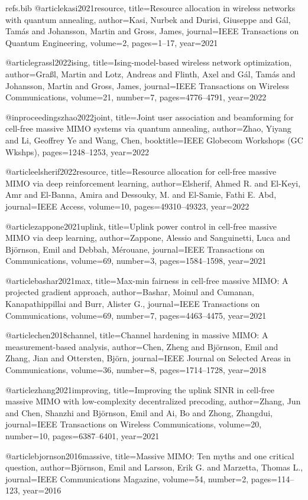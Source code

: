 \begin{filecontents*}{refs.bib}
@article{kasi2021resource,
  title={Resource allocation in wireless networks with quantum annealing},
  author={Kasi, Nurbek and Durisi, Giuseppe and G{\'a}l, Tam{\'a}s and Johansson, Martin and Gross, James},
  journal={IEEE Transactions on Quantum Engineering},
  volume={2},
  pages={1--17},
  year={2021}
}

@article{grassl2022ising,
  title={Ising-model-based wireless network optimization},
  author={Gra{\ss}l, Martin and Lotz, Andreas and Flinth, Axel and G{\'a}l, Tam{\'a}s and Johansson, Martin and Gross, James},
  journal={IEEE Transactions on Wireless Communications},
  volume={21},
  number={7},
  pages={4776--4791},
  year={2022}
}

@inproceedings{zhao2022joint,
  title={Joint user association and beamforming for cell-free massive MIMO systems via quantum annealing},
  author={Zhao, Yiyang and Li, Geoffrey Ye and Wang, Chen},
  booktitle={IEEE Globecom Workshops (GC Wkshps)},
  pages={1248--1253},
  year={2022}
}

@article{elsherif2022resource,
  title={Resource allocation for cell-free massive MIMO via deep reinforcement learning},
  author={Elsherif, Ahmed R. and El-Keyi, Amr and El-Banna, Amira and Dessouky, M. and El-Samie, Fathi E. Abd},
  journal={IEEE Access},
  volume={10},
  pages={49310--49323},
  year={2022}
}

@article{zappone2021uplink,
  title={Uplink power control in cell-free massive MIMO via deep learning},
  author={Zappone, Alessio and Sanguinetti, Luca and Bj\"ornson, Emil and Debbah, M{\'e}rouane},
  journal={IEEE Transactions on Communications},
  volume={69},
  number={3},
  pages={1584--1598},
  year={2021}
}

@article{bashar2021max,
  title={Max-min fairness in cell-free massive MIMO: A projected gradient approach},
  author={Bashar, Moinul and Cumanan, Kanapathippillai and Burr, Alister G.},
  journal={IEEE Transactions on Communications},
  volume={69},
  number={7},
  pages={4463--4475},
  year={2021}
}

@article{chen2018channel,
  title={Channel hardening in massive MIMO: A measurement-based analysis},
  author={Chen, Zheng and Bj{\"o}rnson, Emil and Zhang, Jian and Ottersten, Bj{\"o}rn},
  journal={IEEE Journal on Selected Areas in Communications},
  volume={36},
  number={8},
  pages={1714--1728},
  year={2018}
}

@article{zhang2021improving,
  title={Improving the uplink SINR in cell-free massive MIMO with low-complexity decentralized precoding},
  author={Zhang, Jun and Chen, Shanzhi and Bj{\"o}rnson, Emil and Ai, Bo and Zhong, Zhangdui},
  journal={IEEE Transactions on Wireless Communications},
  volume={20},
  number={10},
  pages={6387--6401},
  year={2021}
}

@article{bjornson2016massive,
  title={Massive MIMO: Ten myths and one critical question},
  author={Bj{\"o}rnson, Emil and Larsson, Erik G. and Marzetta, Thomas L.},
  journal={IEEE Communications Magazine},
  volume={54},
  number={2},
  pages={114--123},
  year={2016}
}
\end{filecontents*}


